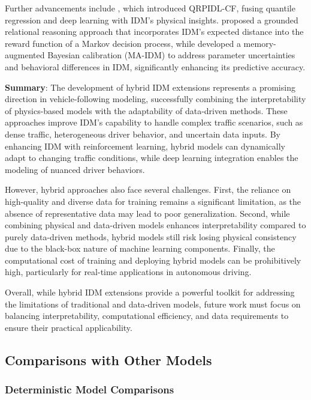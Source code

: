 \documentclass[a4paper,fleqn]{cas-sc}
\begin{document}
Further advancements include \cite{liuQuantileRegressionPhysicsInformedDeepLearning2023c}, which introduced QRPIDL-CF, fusing quantile regression and deep learning with IDM’s physical insights. \cite{tang_grounded_2024} proposed a grounded relational reasoning approach that incorporates IDM’s expected distance into the reward function of a Markov decision process, while \cite{zhang_bayesian_2024} developed a memory-augmented Bayesian calibration (MA-IDM) to address parameter uncertainties and behavioral differences in IDM, significantly enhancing its predictive accuracy.

\textbf{Summary}: The development of hybrid IDM extensions represents a promising direction in vehicle-following modeling, successfully combining the interpretability of physics-based models with the adaptability of data-driven methods. These approaches improve IDM’s capability to handle complex traffic scenarios, such as dense traffic, heterogeneous driver behavior, and uncertain data inputs. By enhancing IDM with reinforcement learning, hybrid models can dynamically adapt to changing traffic conditions, while deep learning integration enables the modeling of nuanced driver behaviors.

However, hybrid approaches also face several challenges. First, the reliance on high-quality and diverse data for training remains a significant limitation, as the absence of representative data may lead to poor generalization. Second, while combining physical and data-driven models enhances interpretability compared to purely data-driven methods, hybrid models still risk losing physical consistency due to the black-box nature of machine learning components. Finally, the computational cost of training and deploying hybrid models can be prohibitively high, particularly for real-time applications in autonomous driving. 

Overall, while hybrid IDM extensions provide a powerful toolkit for addressing the limitations of traditional and data-driven models, future work must focus on balancing interpretability, computational efficiency, and data requirements to ensure their practical applicability.

\subsection{Comparisons with Other Models}

\subsubsection{Deterministic Model Comparisons}
\end{document}
